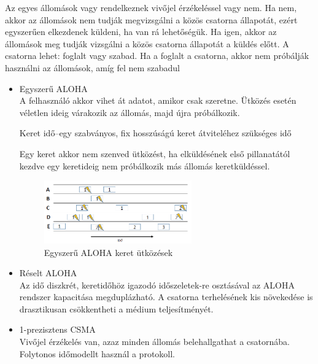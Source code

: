 \documentclass[margin=0px]{article}
\begin{document}
\begin{description}
\begin{description}
\begin{itemize}
                          Az egyes állomások vagy rendelkeznek vivőjel érzékeléssel vagy nem. Ha nem, akkor az állomások nem tudják megvizsgálni a közös csatorna állapotát, ezért egyszerűen elkezdenek küldeni, ha van rá lehetőségük. Ha igen, akkor az állomások meg tudják vizsgálni a közös csatorna állapotát a küldés előtt. A csatorna lehet: foglalt vagy szabad. Ha a foglalt a csatorna, akkor nem próbálják használni az állomások, amíg fel nem szabadul

                          \begin{itemize}
                              \item Egyszerű ALOHA \\
                                    A felhasználó akkor vihet át adatot, amikor csak szeretne. Ütközés esetén véletlen ideig várakozik az állomás, majd újra próbálkozik.

                                    Keret idő–egy szabványos, fix hosszúságú keret átviteléhez szükséges idő

                                    Egy keret akkor nem szenved ütközést, ha elküldésének első pillanatától kezdve egy keretideig nem próbálkozik más állomás keretküldéssel.

                                    \begin{figure}[H]
                                        \centering
                                        \includegraphics[width=0.6\textwidth]{img/egyszeru_aloha.png}
                                        \caption{Egyszerű ALOHA keret ütközések}
                                    \end{figure}
                              \item Réselt ALOHA \\
                                    Az idő diszkrét, keretidőhöz igazodó időszeletek-re osztásával az ALOHA rendszer kapacitása megduplázható. A csatorna terhelésének kis növekedése is drasztikusan csökkentheti a médium teljesítményét.
                              \item 1-prezisztens CSMA \\
                                    Vivőjel érzékelés van, azaz minden állomás belehallgathat a csatornába. Folytonos időmodellt használ a protokoll.


\end{itemize}
\end{itemize}
\end{description}
\end{description}
\end{document}
